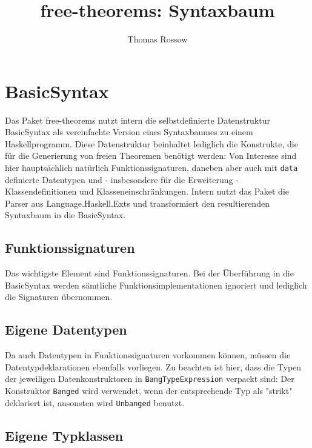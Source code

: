\documentclass[11pt]{article} %
\title{free-theorems: Syntaxbaum}
\author{Thomas Rossow}
\begin{document}
\maketitle

\section{BasicSyntax}

Das Paket free-theorems nutzt intern die selbstdefinierte Datenstruktur BasicSyntax als vereinfachte Version eines Syntaxbaumes zu einem Haskellprogramm. Diese Datenstruktur beinhaltet lediglich die Konstrukte, die für die Generierung von freien Theoremen benötigt werden: Von Interesse sind hier hauptsächlich natürlich Funktionssignaturen, daneben aber auch mit \texttt{data} definierte Datentypen und - insbesondere für die Erweiterung - Klassendefinitionen und Klasseneinschränkungen. Intern nutzt das Paket die Parser aus Language.Haskell.Exts und transformiert den resultierenden Syntaxbaum in die BasicSyntax.

\subsection{Funktionssignaturen}

Das wichtigste Element sind Funktionssignaturen. Bei der Überführung in die BasicSyntax werden sämtliche Funktionsimplementationen ignoriert und lediglich die Signaturen übernommen.



\subsection{Eigene Datentypen}

Da auch Datentypen in Funktionssignaturen vorkommen können, müssen die Datentypdeklarationen ebenfalls vorliegen. Zu beachten ist hier, dass die Typen der jeweiligen Datenkonstruktoren in \texttt{BangTypeExpression} verpackt sind: Der Konstruktor \texttt{Banged} wird verwendet, wenn der entsprechende Typ als "strikt" deklariert ist, ansonsten wird \texttt{Unbanged} benutzt.



\subsection{Eigene Typklassen}
\end{document}
